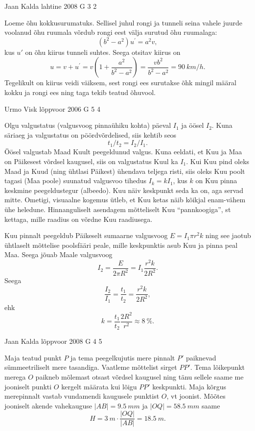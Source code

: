 \documentclass[11pt]{article}
\begin{document}
{%
{Jaan Kalda} %
{lahtine} %
{2008} %
{G 3} %
{2} %
{

\ifSolution
Loeme õhu kokkusurumatuks. Sellisel juhul rongi ja tunneli seina vahele juurde
voolanud õhu ruumala võrdub rongi eest välja surutud õhu ruumalaga:
\[
\left(b^{2}-a^{2}\right) u^{\prime}=a^{2} v,
\]
kus $u'$ on õhu kiirus tunneli suhtes. Seega otsitav kiirus on
\[
u=v+u^{\prime}=v\left(1+\frac{a^{2}}{b^{2}-a^{2}}\right)=\frac{v b^{2}}{b^{2}-a^{2}}=\SI{90}{km/h}.
\]
Tegelikult on kiirus veidi väiksem, sest rongi ees surutakse õhk mingil määral kokku ja rongi ees ning taga tekib teatud õhuvool.
\fi
}

{Urmo Visk} %
{lõppvoor} %
{2006} %
{G 5} %
{4} %
{

\ifSolution
Olgu valgustatus (valgusvoog pinnaühiku kohta) päeval $I_1$ ja öösel $I_2$. Kuna säriaeg ja valgustatus on pöördvõrdelised, siis kehtib seos
\[
t_1/t_2 = I_2/I_1.
\]
Öösel valgustab Maad Kuult peegeldunud valgus. Kuna eeldati, et Kuu ja Maa on Päikesest võrdsel kaugusel, siis on valgustatus Kuul ka $I_1$. Kui Kuu pind oleks Maad ja Kuud (ning ühtlasi Päikest) ühendava teljega risti, siis oleks Kuu poolt tagasi (Maa poole) suunatud valgusvoo tihedus $I_k = kI_1$, kus $k$ on Kuu pinna keskmine peegeldustegur (albeedo). Kuu näiv keskpunkt seda ka on, aga servad mitte. Ometigi, visuaalne kogemus ütleb, et Kuu ketas näib kõikjal enam-vähem ühe heledune. Hinnanguliselt asendagem mõtteliselt Kuu \enquote{pannkoogiga}, st kettaga, mille raadius on võrdne Kuu raadiusega.

Kuu pinnalt peegeldub Päikeselt sumaarne valgusvoog $E = I_1 \pi r^2k$ ning see jaotub ühtlaselt mõttelise poolsfääri peale, mille keskpunktis asub Kuu ja pinna peal Maa. Seega jõuab Maale valgusvoog
\[
I_2 = \frac{E}{2\pi R^2} = I_1 \frac{r^2k}{2R^2}.
\]
Seega
\[
\frac{I_2}{I_1} = \frac{t_1}{t_2} = \frac{r^2k}{2R^2},
\]
ehk
\[
k = \frac{t_1}{t_2} \frac{2R^2}{r^2} \approx \SI{8}{\%}.
\]
\fi
}

{Jaan Kalda} %
{lõppvoor} %
{2008} %
{G 4} %
{5} %
{

\ifSolution
Maja teatud punkt $P$ ja tema peegelkujutis mere pinnalt $P'$ paiknevad sümmeetriliselt mere tasandiga. Vaatleme mõttelist sirget $PP'$. Tema lõikepunkt merega $O$ paikneb mõlemast otsast võrdsel kaugusel ning tänu sellele saame me jooniselt punkti $O$ kergelt määrata kui lõigu $PP'$ keskpunkti. Maja kõrgus merepinnalt vastab vundamendi kaugusele punktist $O$, vt joonist. Mõõtes jooniselt akende vahekauguse $|AB| = \SI{9,5}{mm}$ ja $|OQ| = \SI{58,5}{mm}$ saame
\[
H = \SI{3}{m} \cdot \frac{|OQ|}{|AB|} = \SI{18,5}{m}.
\]

}}
\end{document}
